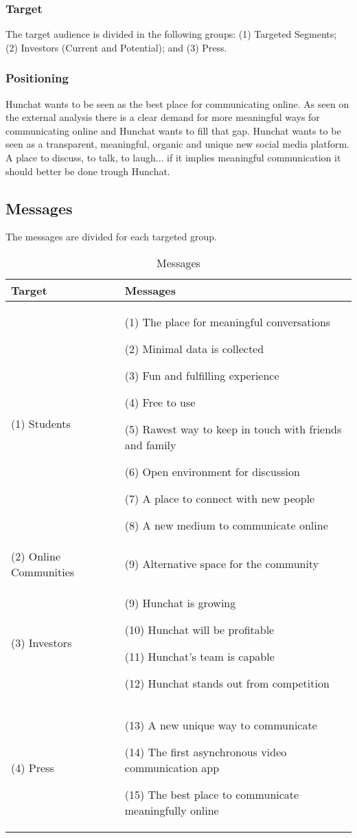 \documentclass[12pt]{article}
\begin{document}
\subsubsection{Target}
The target audience is divided in the following groups: (1) Targeted Segments; (2) Investors (Current and Potential); and (3) Press.

\subsubsection{Positioning}
Hunchat wants to be seen as the best place for communicating online. As seen on the external analysis there is a clear demand for more meaningful ways for communicating online and Hunchat wants to fill that gap. Hunchat wants to be seen as a transparent, meaningful, organic and unique new social media platform. A place to discuss, to talk, to laugh... if it implies meaningful communication it should better be done trough Hunchat.


\subsection{Messages}
The messages are divided for each targeted group.


\begin{table}[htb]
\small
\caption{Messages}
\label{table:msg}
\centering
\begin{tabular}{ @{}P{0.28\textwidth}P{0.62\textwidth}@{} }
Target	&	Messages	\\ \hline
(1) Students \par 	&	(1) The place for meaningful conversations \par (2) Minimal data is collected \par (3) Fun and fulfilling experience \par  (4) Free to use \par (5) Rawest way to keep in touch with friends and family \par (6) Open environment for discussion  \par  (7) A place to connect with new people \par (8) A new medium to communicate online \\
(2) Online Communities & (9) Alternative space for the community \\
(3) Investors	&	(9) Hunchat is growing \par (10) Hunchat will be profitable \par (11) Hunchat's team is capable  \par (12) Hunchat stands out from competition \\
(4) Press	& 	(13) A new unique way to communicate \par (14) The first asynchronous video communication app \par (15) The best place to communicate meaningfully online \\
 \hline
\end{tabular}
\end{table}
\end{document}
